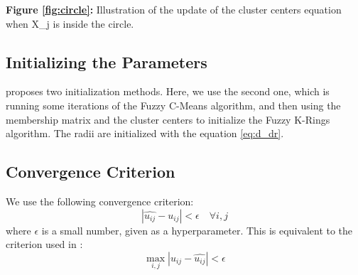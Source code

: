 \documentclass[conference]{IEEEtran}
\begin{document}
\begin{center}
\textbf{Figure \ref{fig:circle}:} Illustration of the update of the cluster centers equation when X_j is inside the circle.
\end{center}

\subsection{Initializing the Parameters}
\cite{b1} proposes two initialization methods. Here, we use the second one, which is running some iterations of
the Fuzzy C-Means algorithm, and then using the membership matrix and the cluster centers to initialize the Fuzzy K-Rings algorithm.
The radii are initialized with the equation \eqref{eq:d_dr}.

\subsection{Convergence Criterion}
We use the following convergence criterion:
\begin{equation}
|\hat{u_{ij}} - u_{ij}| < \epsilon \quad \forall i, j
\end{equation}
where $\epsilon$ is a small number, given as a hyperparameter.
This is equivalent to the criterion used in \cite{b1}:
\begin{equation}
\max_{i, j} |u_{ij} - \hat{u_{ij}}| < \epsilon
\end{equation}
\end{document}
